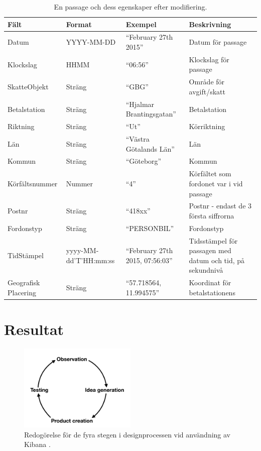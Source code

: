 \documentclass{kththesis}
\begin{document}
\begin{table}[h!]
  \begin{center}
    \caption{En passage och dess egenskaper efter modifiering.}
    \label{tab:table1}
    \begin{tabular}{|p{3cm}|p{3cm}|p{3cm}|p{3cm}|}
         \hline
      \textbf{Fält} & \textbf{Format} & \textbf{Exempel} & \textbf{Beskrivning}\\
      \hline
      Datum & YYYY-MM-DD & “February 27th 2015” & Datum för passage\\ %
        \hline
      Klockslag & HHMM& “06:56” & Klockslag för passage\\ %
        \hline
      SkatteObjekt & Sträng & “GBG”
 & Område för avgift/skatt\\ %
        \hline
      Betalstation & Sträng & “Hjalmar Brantingsgatan” & Betalstation\\ %
        \hline
      Riktning & Sträng & “Ut” & Körriktning\\ %
        \hline
      Län & Sträng & “Västra Götalands Län” & Län\\ %
        \hline
      Kommun & Sträng & “Göteborg” & Kommun\\ %
        \hline
      Körfältsnummer & Nummer & “4” &  Körfältet som fordonet var i vid passage\\ %
        \hline
          Postnr & Sträng & “418xx”
 & Postnr - endast de 3 första siffrorna\\ %
        \hline
          Fordonstyp & Sträng & “PERSONBIL” & Fordonstyp\\ %
        \hline
          TidStämpel & yyyy-MM-dd'T'HH:mm:ss
 & “February 27th 2015, 07:56:03” & Tidsstämpel för passagen med datum och tid, på sekundnivå 
\\ %
        \hline
Geografisk Placering & Sträng & “57.718564, 11.994575” & 
Koordinat för betalstationens 
\\ %
        \hline
    \end{tabular}
  \end{center}
\end{table}

\chapter{Resultat}

\begin{figure}[h]

\centering
\includegraphics[width=0.5\textwidth]{ProductCreation}
\caption{Redogörelse för de fyra stegen i designprocessen vid användning av Kibana
.}
\end{figure}
\end{document}
